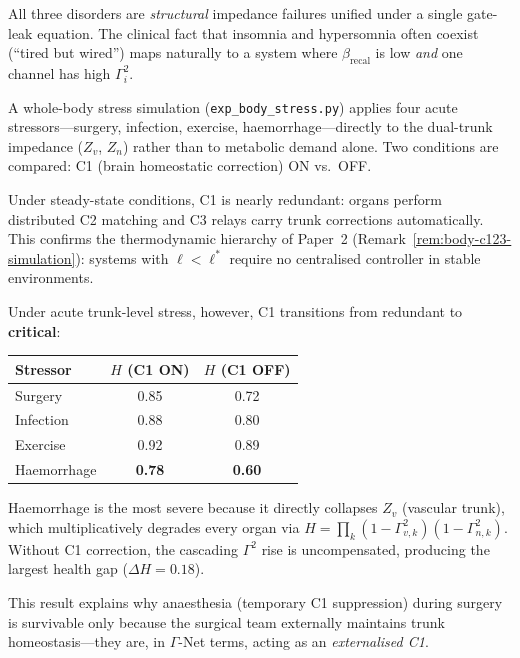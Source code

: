 \documentclass[aps,pre,twocolumn,superscriptaddress,floatfix]{revtex4-2}
\begin{document}
\noindent
All three disorders are \emph{structural}
impedance failures unified under a single
gate-leak equation.
The clinical fact that insomnia and hypersomnia
often coexist (``tired but wired'') maps naturally
to a system where $\beta_{\text{recal}}$ is low
\emph{and} one channel has high $\Gamma_i^2$.

\begin{remark}
\label{rem:acute-stress}
A whole-body stress simulation
(\texttt{exp\_body\_stress.py}) applies four acute
stressors---surgery, infection, exercise,
haemorrhage---directly to the dual-trunk impedance
($Z_v$, $Z_n$) rather than to metabolic demand alone.
Two conditions are compared: C1 (brain homeostatic
correction) ON vs.\ OFF.

Under steady-state conditions, C1 is nearly
redundant: organs perform distributed C2 matching
and C3 relays carry trunk corrections automatically.
This confirms the thermodynamic hierarchy of Paper~2
(Remark~\ref*{rem:body-c123-simulation}):
systems with $\ell < \ell^*$ require no centralised
controller in stable environments.

Under acute trunk-level stress, however, C1
transitions from redundant to \textbf{critical}:
\begin{center}
\renewcommand{\arraystretch}{1.15}
\begin{tabular}{@{}lcc@{}}
\toprule
Stressor & $H$ (C1 ON) & $H$ (C1 OFF) \\
\midrule
Surgery      & 0.85 & 0.72 \\
Infection    & 0.88 & 0.80 \\
Exercise     & 0.92 & 0.89 \\
Haemorrhage  & \textbf{0.78} & \textbf{0.60} \\
\bottomrule
\end{tabular}
\end{center}
Haemorrhage is the most severe because it directly
collapses $Z_v$ (vascular trunk), which multiplicatively
degrades every organ via
$H = \prod_k(1-\Gamma_{v,k}^2)(1-\Gamma_{n,k}^2)$.
Without C1 correction, the cascading $\Gamma^2$ rise
is uncompensated, producing the largest health gap
($\Delta H = 0.18$).

This result explains why anaesthesia (temporary C1
suppression) during surgery is survivable only because
the surgical team externally maintains trunk
homeostasis---they are, in $\Gamma$-Net terms,
acting as an \emph{externalised C1}.
\end{remark}
\end{document}
